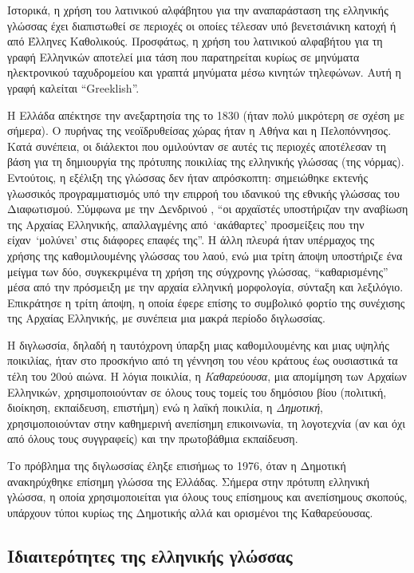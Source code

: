 \begin{multicols}{2}
Ιστορικά, η χρήση του λατινικού αλφάβητου για την αναπαράσταση της ελληνικής γλώσσας έχει διαπιστωθεί σε περιοχές οι οποίες τέλεσαν υπό βενετσιάνικη κατοχή ή από Έλληνες Καθολικούς. Προσφάτως, η χρήση του λατινικού αλφαβήτου για τη γραφή Ελληνικών αποτελεί μια τάση που παρατηρείται κυρίως σε μηνύματα ηλεκτρονικού ταχυδρομείου και γραπτά μηνύματα μέσω κινητών τηλεφώνων. Αυτή η γραφή καλείται “Greeklish”.
\columnbreak


Η Ελλάδα απέκτησε την ανεξαρτησία της το 1830 (ήταν πολύ μικρότερη σε σχέση με σήμερα). Ο πυρήνας της νεοϊδρυθείσας χώρας ήταν η Αθήνα και η Πελοπόννησος. Κατά συνέπεια, οι διάλεκτοι που ομιλούνταν σε αυτές τις περιοχές αποτέλεσαν τη βάση για τη δημιουργία της πρότυπης ποικιλίας της ελληνικής γλώσσας (της νόρμας).  Εντούτοις, η εξέλιξη της γλώσσας δεν ήταν απρόσκοπτη: σημειώθηκε εκτενής γλωσσικός προγραμματισμός υπό την επιρροή του ιδανικού της εθνικής γλώσσας του Διαφωτισμού. Σύμφωνα με την Δενδρινού \cite{Dend1}, “οι αρχαϊστές υποστήριζαν την αναβίωση της Αρχαίας Ελληνικής, απαλλαγμένης από~`ακάθαρτες' προσμείξεις που την είχαν~`μολύνει' στις διάφορες επαφές της”. Η άλλη πλευρά ήταν υπέρμαχος της χρήσης της καθομιλουμένης γλώσσας του λαού, ενώ μια τρίτη άποψη υποστήριζε ένα μείγμα των δύο, συγκεκριμένα τη χρήση της σύγχρονης γλώσσας, “καθαρισμένης” μέσα από την πρόσμειξη με την αρχαία ελληνική μορφολογία, σύνταξη και λεξιλόγιο. Επικράτησε η τρίτη άποψη, η οποία έφερε επίσης το συμβολικό φορτίο της συνέχισης της Αρχαίας Ελληνικής, με συνέπεια μια μακρά περίοδο διγλωσσίας.

Η διγλωσσία, δηλαδή η ταυτόχρονη ύπαρξη μιας καθομιλουμένης και μιας υψηλής ποικιλίας, ήταν στο προσκήνιο από τη γέννηση του νέου κράτους έως ουσιαστικά τα τέλη του 20ού αιώνα. Η λόγια ποικιλία, η  \textit{Καθαρεύουσα}, μια απομίμηση των Αρχαίων Ελληνικών, χρησιμοποιούνταν σε όλους τους τομείς του δημόσιου βίου (πολιτική, διοίκηση, εκπαίδευση, επιστήμη) ενώ η λαϊκή ποικιλία, η  \textit{Δημοτική}, χρησιμοποιούνταν στην καθημερινή ανεπίσημη επικοινωνία, τη λογοτεχνία (αν και όχι από όλους τους συγγραφείς) και την πρωτοβάθμια εκπαίδευση.

Το πρόβλημα της διγλωσσίας έληξε επισήμως το 1976, όταν η Δημοτική ανακηρύχθηκε επίσημη γλώσσα της Ελλάδας. Σήμερα στην πρότυπη ελληνική γλώσσα, η οποία χρησιμοποιείται για όλους τους επίσημους και ανεπίσημους σκοπούς, υπάρχουν τύποι κυρίως της Δημοτικής αλλά και ορισμένοι της Καθαρεύουσας.

\subsection{Ιδιαιτερότητες της ελληνικής γλώσσας}


\end{multicols}
